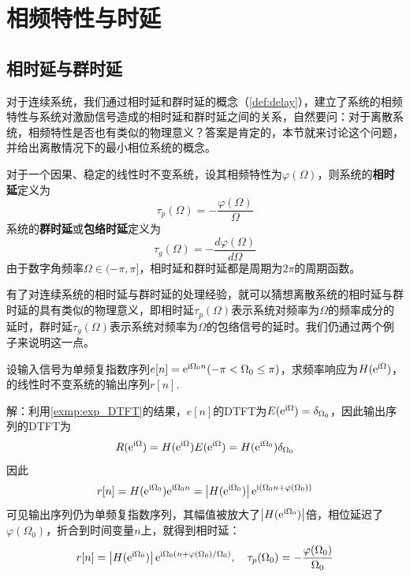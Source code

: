 \section{相频特性与时延}\label{sec:discrete_system_delay}

\subsection{相时延与群时延}\label{sub:phase_group_delay}

对于连续系统，我们通过相时延和群时延的概念（\cref{def:delay}），建立了系统的相频特性与系统对激励信号造成的相时延和群时延之间的关系，自然要问：对于离散系统，相频特性是否也有类似的物理意义？答案是肯定的，本节就来讨论这个问题，并给出离散情况下的最小相位系统的概念。

\begin{definition}[相时延与群时延]
    对于一个因果、稳定的线性时不变系统，设其相频特性为$\varphi(\Omega)$，则系统的\textbf{相时延}定义为
    $$\tau_p(\Omega)=-\frac{\varphi(\Omega)}{\Omega}$$
    系统的\textbf{群时延}或\textbf{包络时延}定义为
    $$\tau_g(\Omega)=-\frac{d\varphi(\Omega)}{d\Omega}$$
    由于数字角频率$\Omega\in(-\pi,\pi]$，相时延和群时延都是周期为$2\pi$的周期函数。
\end{definition}

有了对连续系统的相时延与群时延的处理经验，就可以猜想离散系统的相时延与群时延的具有类似的物理意义，即相时延$\tau_p(\Omega)$表示系统对频率为$\Omega$的频率成分的延时，群时延$\tau_g(\Omega)$表示系统对频率为$\Omega$的包络信号的延时。我们仍通过两个例子来说明这一点。

\begin{example}[相时延]
    设输入信号为单频复指数序列$e[n]=\mathrm{e}^{\mathrm{i}\Omega_0 n}(-\pi<\Omega_0\le\pi)$，求频率响应为$H(\mathrm{e}^{\mathrm{i}\Omega})$，的线性时不变系统的输出序列$r[n]$.

    解：利用\cref{exmp:exp_DTFT}的结果，$e[n]$的DTFT为$E(\mathrm{e}^{\mathrm{i}\Omega})=\delta_{\Omega_0}$，因此输出序列的DTFT为
    $$R(\mathrm{e}^{\mathrm{i}\Omega})=H(\mathrm{e}^{\mathrm{i}\Omega})E(\mathrm{e}^{\mathrm{i}\Omega})=H(\mathrm{e}^{\mathrm{i}\Omega_0})\delta_{\Omega_0}$$
    因此
    $$r[n]=H(\mathrm{e}^{\mathrm{i}\Omega_0})\mathrm{e}^{\mathrm{i}\Omega_0 n}=\left|H(\mathrm{e}^{\mathrm{i}\Omega_0})\right|\mathrm{e}^{\mathrm{i}(\Omega_0 n+\varphi(\Omega_0))}$$
    可见输出序列仍为单频复指数序列，其幅值被放大了$\left|H(\mathrm{e}^{\mathrm{i}\Omega_0})\right|$倍，相位延迟了$\varphi(\Omega_0)$，折合到时间变量$n$上，就得到相时延：
    $$r[n]=\left|H(\mathrm{e}^{\mathrm{i}\Omega_0})\right|\mathrm{e}^{\mathrm{i}\Omega_0 (n+\varphi(\Omega_0)/\Omega_0)},\quad \tau_p(\Omega_0)=-\frac{\varphi(\Omega_0)}{\Omega_0}$$
\end{example}

